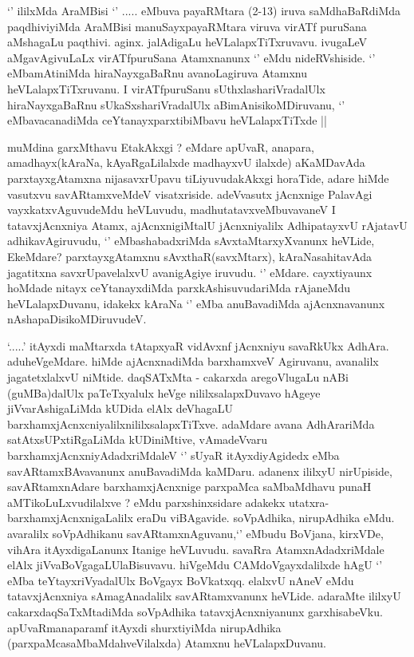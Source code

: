 \begin{center}


\end{center}

\begin{artha}
`\stext' ililxMda AraMBisi `\stext' ..... eMbuva payaRMtara (2-13) iruva saMdhaBaRdiMda paqdhiviyiMda AraMBisi manuSayxpayaRMtara viruva virATf puruSana aMshagaLu paqthivi. aginx. jalAdigaLu heVLalapxTiTxruvavu. ivugaLeV aMgavAgivuLaLx virATfpuruSana Atamxnanunx `\stext' eMdu nideRVshiside. `\stext' eMbamAtiniMda hiraNayxgaBaRnu avanoLagiruva Atamxnu heVLalapxTiTxruvanu. I virATfpuruSanu sUthxlashariVradalUlx hiraNayxgaBaRnu sUkaSxshariVradalUlx aBimAnisikoMDiruvanu, `\stext' eMbavacanadiMda ceYtanayxparxtibiMbavu heVLalapxTiTxde ||
\end{artha}

\begin{artha}
 muMdina garxMthavu EtakAkxgi ? eMdare apUvaR, anapara, amadhayx(kAraNa, kAyaRgaLilalxde madhayxvU ilalxde) aKaMDavAda parxtayxgAtamxna nijasavxrUpavu tiLiyuvudakAkxgi horaTide, adare hiMde vasutxvu savARtamxveMdeV visatxriside. adeVvasutx jAcnxnige PalavAgi vayxkatxvAguvudeMdu heVLuvudu, madhutatavxveMbuvavaneV I tatavxjAcnxniya Atamx, ajAcnxnigiMtalU jAcnxniyalilx AdhipatayxvU rAjatavU adhikavAgiruvudu, `\stext' eMbashabadxriMda sAvxtaMtarxyXvanunx heVLide, EkeMdare? parxtayxgAtamxnu sAvxthaR(savxMtarx), kAraNasahitavAda jagatitxna savxrUpavelalxvU avanigAgiye iruvudu. 
 `\stext' eMdare. cayxtiyaunx hoMdade nitayx ceYtanayxdiMda parxkAshisuvudariMda rAjaneMdu heVLalapxDuvanu, idakekx kAraNa `\stext' eMba anuBavadiMda ajAcnxnavanunx nAshapaDisikoMDiruvudeV.
\end{artha}

\begin{artha}
`\stext.....' itAyxdi maMtarxda tAtapxyaR vidAvxnf jAcnxniyu savaRkUkx AdhAra. aduheVgeMdare. hiMde ajAcnxnadiMda barxhamxveV Agiruvanu, avanalilx jagatetxlalxvU niMtide. daqSATxMta - cakarxda aregoVlugaLu nABi (guMBa)dalUlx paTeTxyalulx heVge nililxsalapxDuvavo hAgeye jiVvarAshigaLiMda kUDida elAlx deVhagaLU barxhamxjAcnxcniyalilxnililxsalapxTiTxve. adaMdare avana AdhArariMda satAtxsUPxtiRgaLiMda kUDiniMtive, vAmadeVvaru barxhamxjAcnxniyAdadxriMdaleV `\stext' sUyaR itAyxdiyAgidedx eMba savARtamxBAvavanunx anuBavadiMda kaMDaru. adanenx ililxyU nirUpiside, savARtamxnAdare barxhamxjAcnxnige parxpaMca saMbaMdhavu punaH aMTikoLuLxvudilalxve ? eMdu parxshinxsidare adakekx utatxra- barxhamxjAcnxnigaLalilx eraDu viBAgavide. soVpAdhika, nirupAdhika eMdu. avaralilx soVpAdhikanu savARtamxnAguvanu,`\stext' eMbudu BoVjana, kirxVDe, vihAra itAyxdigaLanunx Itanige heVLuvudu. savaRra AtamxnAdadxriMdale elAlx jiVvaBoVgagaLUlaBisuvavu. hiVgeMdu CAMdoVgayxdalilxde hAgU `\stext' eMba teYtayxriVyadalUlx BoVgayx BoVkatxqq. elalxvU nAneV eMdu tatavxjAcnxniya sAmagAnadalilx savARtamxvanunx heVLide. adaraMte ililxyU cakarxdaqSaTxMtadiMda soVpAdhika tatavxjAcnxniyanunx garxhisabeVku. apUvaRmanaparamf itAyxdi shurxtiyiMda nirupAdhika (parxpaMcasaMbaMdahveVilalxda) Atamxnu heVLalapxDuvanu.
\end{artha}

